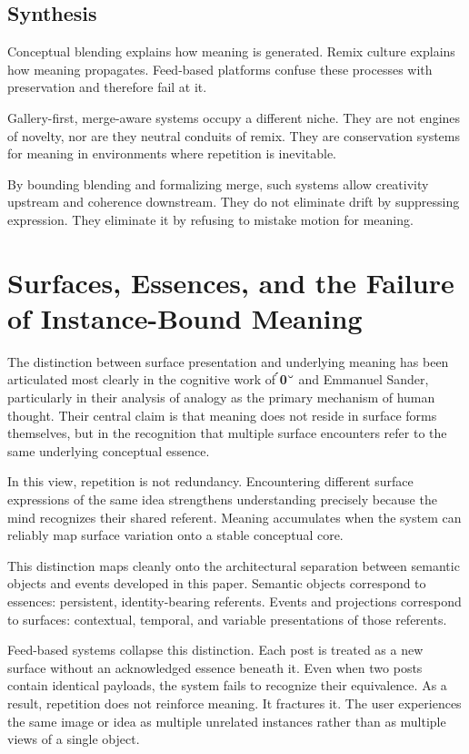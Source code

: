 \documentclass[11pt,oneside]{article}
\begin{document}
\subsection{Synthesis}

Conceptual blending explains how meaning is generated. Remix culture explains how meaning propagates. Feed-based platforms confuse these processes with preservation and therefore fail at it.

Gallery-first, merge-aware systems occupy a different niche. They are not engines of novelty, nor are they neutral conduits of remix. They are conservation systems for meaning in environments where repetition is inevitable.

By bounding blending and formalizing merge, such systems allow creativity upstream and coherence downstream. They do not eliminate drift by suppressing expression. They eliminate it by refusing to mistake motion for meaning.

\section{Surfaces, Essences, and the Failure of Instance-Bound Meaning}

The distinction between surface presentation and underlying meaning has been articulated most clearly in the cognitive work of \textbf{0} and Emmanuel Sander, particularly in their analysis of analogy as the primary mechanism of human thought. Their central claim is that meaning does not reside in surface forms themselves, but in the recognition that multiple surface encounters refer to the same underlying conceptual essence.

In this view, repetition is not redundancy. Encountering different surface expressions of the same idea strengthens understanding precisely because the mind recognizes their shared referent. Meaning accumulates when the system can reliably map surface variation onto a stable conceptual core.

This distinction maps cleanly onto the architectural separation between semantic objects and events developed in this paper. Semantic objects correspond to essences: persistent, identity-bearing referents. Events and projections correspond to surfaces: contextual, temporal, and variable presentations of those referents.

Feed-based systems collapse this distinction. Each post is treated as a new surface without an acknowledged essence beneath it. Even when two posts contain identical payloads, the system fails to recognize their equivalence. As a result, repetition does not reinforce meaning. It fractures it. The user experiences the same image or idea as multiple unrelated instances rather than as multiple views of a single object.
\end{document}
